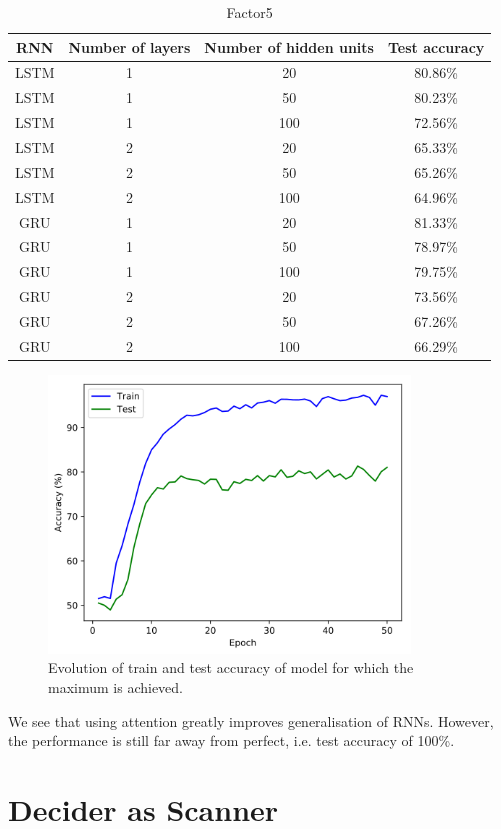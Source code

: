 \documentclass[titlepage]{report}
\newcommand{\otoprule}{\midrule[\heavyrulewidth]}
\begin{document}
\begin{table}[H]
\caption{Factor5}
\centering
\begin{tabular}{cccc}
\toprule%
\textbf{RNN} & \textbf{Number of layers} & \textbf{Number of hidden units} & \textbf{Test accuracy} \\
\otoprule%
LSTM & 1 & 20 & 80.86\% \\
LSTM & 1 & 50 & 80.23\% \\
LSTM & 1 & 100 & 72.56\% \\
LSTM & 2 & 20 & 65.33\% \\
LSTM & 2 & 50 & 65.26\% \\
LSTM & 2 & 100 & 64.96\% \\
GRU & 1 & 20 & 81.33\% \\ 
GRU & 1 & 50 & 78.97\% \\
GRU & 1 & 100 & 79.75\% \\
GRU & 2 & 20 & 73.56\% \\
GRU & 2 & 50 & 67.26\% \\
GRU & 2 & 100 & 66.29\% \\
\bottomrule
\end{tabular}
\end{table}

\begin{figure}[H]
\centering
\includegraphics[width = 96mm]{figures/plots/attn_gru_1_20_8132}
\caption{Evolution of train and test accuracy of model for which the maximum is achieved.}
\end{figure}

We see that using attention greatly improves generalisation of RNNs. However, the performance is still far away from perfect, i.e. test accuracy of 100\%.

\section{Decider as Scanner}
\end{document}
